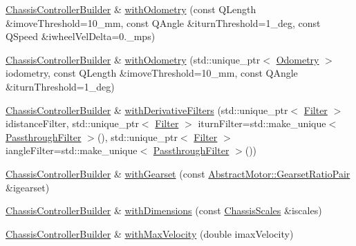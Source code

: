 \begin{DoxyCompactItemize}
\item 
\mbox{\hyperlink{classokapi_1_1ChassisControllerBuilder}{Chassis\+Controller\+Builder}} \& \mbox{\hyperlink{classokapi_1_1ChassisControllerBuilder_a2dfb66cd7cf160b8cce3e9c2ffec7c74}{with\+Odometry}} (const Q\+Length \&imove\+Threshold=10\+\_\+mm, const Q\+Angle \&iturn\+Threshold=1\+\_\+deg, const Q\+Speed \&iwheel\+Vel\+Delta=0.\+\_\+mps)
\item 
\mbox{\hyperlink{classokapi_1_1ChassisControllerBuilder}{Chassis\+Controller\+Builder}} \& \mbox{\hyperlink{classokapi_1_1ChassisControllerBuilder_ad581d48529b154b1335aada35465e3ac}{with\+Odometry}} (std\+::unique\+\_\+ptr$<$ \mbox{\hyperlink{classokapi_1_1Odometry}{Odometry}} $>$ iodometry, const Q\+Length \&imove\+Threshold=10\+\_\+mm, const Q\+Angle \&iturn\+Threshold=1\+\_\+deg)
\item 
\mbox{\hyperlink{classokapi_1_1ChassisControllerBuilder}{Chassis\+Controller\+Builder}} \& \mbox{\hyperlink{classokapi_1_1ChassisControllerBuilder_a4d65988fd98e4530dfa236fce6d4d99a}{with\+Derivative\+Filters}} (std\+::unique\+\_\+ptr$<$ \mbox{\hyperlink{classokapi_1_1Filter}{Filter}} $>$ idistance\+Filter, std\+::unique\+\_\+ptr$<$ \mbox{\hyperlink{classokapi_1_1Filter}{Filter}} $>$ iturn\+Filter=std\+::make\+\_\+unique$<$ \mbox{\hyperlink{classokapi_1_1PassthroughFilter}{Passthrough\+Filter}} $>$(), std\+::unique\+\_\+ptr$<$ \mbox{\hyperlink{classokapi_1_1Filter}{Filter}} $>$ iangle\+Filter=std\+::make\+\_\+unique$<$ \mbox{\hyperlink{classokapi_1_1PassthroughFilter}{Passthrough\+Filter}} $>$())
\item 
\mbox{\hyperlink{classokapi_1_1ChassisControllerBuilder}{Chassis\+Controller\+Builder}} \& \mbox{\hyperlink{classokapi_1_1ChassisControllerBuilder_aea1e3d32abede99a1b565205275aea78}{with\+Gearset}} (const \mbox{\hyperlink{structokapi_1_1AbstractMotor_1_1GearsetRatioPair}{Abstract\+Motor\+::\+Gearset\+Ratio\+Pair}} \&igearset)
\item 
\mbox{\hyperlink{classokapi_1_1ChassisControllerBuilder}{Chassis\+Controller\+Builder}} \& \mbox{\hyperlink{classokapi_1_1ChassisControllerBuilder_a72a642f59112da74960942aae390a5ed}{with\+Dimensions}} (const \mbox{\hyperlink{classokapi_1_1ChassisScales}{Chassis\+Scales}} \&iscales)
\item 
\mbox{\hyperlink{classokapi_1_1ChassisControllerBuilder}{Chassis\+Controller\+Builder}} \& \mbox{\hyperlink{classokapi_1_1ChassisControllerBuilder_aee0580c75bf16663f065aad88fdc795d}{with\+Max\+Velocity}} (double imax\+Velocity)
\item 

\end{DoxyCompactItemize}
